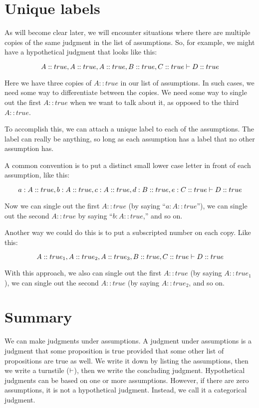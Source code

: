 \documentclass[../../../main.tex]{subfiles}
\begin{document}
\section{Unique labels}

As will become clear later, we will encounter situations where there are multiple copies of the same judgment in the list of assumptions. So, for example, we might have a hypothetical judgment that looks like this:

\begin{equation*}
  A :: true, A :: true, A :: true, B :: true, C :: true \ndturnstile/ D :: true
\end{equation*}

\noindent
Here we have three copies of $A :: true$ in our list of assumptions. In such cases, we need some way to differentiate between the copies. We need some way to single out the first $A :: true$ when we want to talk about it, as opposed to the third $A :: true$. 

To accomplish this, we can attach a unique label to each of the assumptions. The label can really be anything, so long as each assumption has a label that no other assumption has. 

A common convention is to put a distinct small lower case letter in front of each assumption, like this:

\begin{equation*}
  a : A :: true, b : A :: true, c : A :: true, d : B :: true, e : C :: true \ndturnstile/ D :: true
\end{equation*}

\noindent
Now we can single out the first $A :: true$ (by saying ``$a : A :: true$''), we can single out the second $A :: true$ by saying ``$b : A :: true$,'' and so on.

Another way we could do this is to put a subscripted number on each copy. Like this:

\begin{equation*}
  A :: true_{1}, A :: true_{2}, A :: true_{3}, B :: true, C :: true \ndturnstile/ D :: true
\end{equation*}

\noindent
With this approach, we also can single out the first $A :: true$ (by saying $A :: true_{1}$), we can single out the second $A :: true$ (by saying $A :: true_{2}$, and so on.


\section{Summary}

We can make judgments under assumptions. A judgment under assumptions is a judgment that some proposition is true provided that some other list of propositions are true as well. We write it down by listing the assumptions, then we write a turnstile ($\ndturnstile/$), then we write the concluding judgment. Hypothetical judgments can be based on one or more assumptions. However, if there are zero assumptions, it is not a hypothetical judgment. Instead, we call it a categorical judgment.
\end{document}
